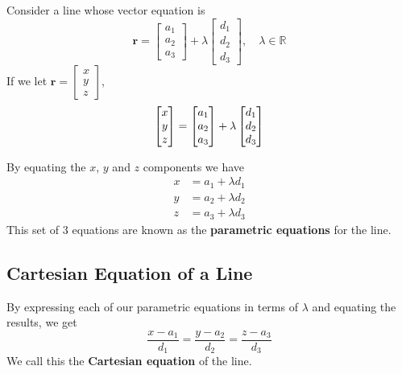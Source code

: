 \documentclass[11pt,a4paper]{book}
\newcommand{\R}{\mathbb{R}}
\begin{document}
\renewcommand\arraystretch{.7}
Consider a line whose vector equation is
\[
\textbf{r}=\begin{bmatrix}a_{1}\\
a_{2}\\
a_{3}
\end{bmatrix}+\lambda\begin{bmatrix}d_{1}\\
d_{2}\\
d_{3}
\end{bmatrix},\quad\lambda\in\R
\]
If we let $\textbf{r}=\begin{bmatrix}x\\
y\\
z
\end{bmatrix}$,
\[
\textbf{\ensuremath{\begin{bmatrix}x\\
 y\\
 z
\end{bmatrix}}}=\begin{bmatrix}a_{1}\\
a_{2}\\
a_{3}
\end{bmatrix}+\lambda\begin{bmatrix}d_{1}\\
d_{2}\\
d_{3}
\end{bmatrix}
\]
\begin{tcolorbox}[colback=blue!5, colframe=black, boxrule=.4pt, sharpish corners]

By equating the $x$, $y$ and $z$ components we have
\begin{align*}
x & =a_{1}+\lambda d_{1}\\
y & =a_{2}+\lambda d_{2}\\
z & =a_{3}+\lambda d_{3}
\end{align*}
This set of 3 equations are known as the \textbf{parametric equations}
for the line.
\end{tcolorbox}


\subsection{Cartesian Equation of a Line}

\begin{tcolorbox}[colback=blue!5, colframe=black, boxrule=.4pt, sharpish corners]

By expressing each of our parametric equations in terms of $\lambda$
and equating the results, we get
\[
\frac{x-a_{1}}{d_{1}}=\frac{y-a_{2}}{d_{2}}=\frac{z-a_{3}}{d_{3}}
\]
We call this the \textbf{Cartesian equation} of the line.
\end{tcolorbox}
\end{document}
